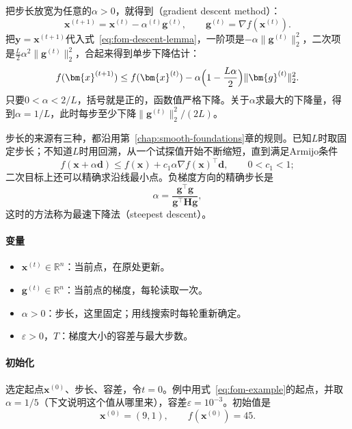 把步长放宽为任意的$\alpha>0$，就得到（gradient descent method）：
\begin{equation}
 \bm{x}^{(t+1)}=\bm{x}^{(t)}-\alpha^{(t)}\bm{g}^{(t)},\qquad \bm{g}^{(t)}=\nabla f(\bm{x}^{(t)}).
 \label{eq:fom-gd}
\end{equation}
把$\bm{y}=\bm{x}^{(t+1)}$代入式~\eqref{eq:fom-descent-lemma}，一阶项是$-\alpha\lVert\bm{g}^{(t)}\rVert_2^2$，二次项是$\tfrac{L}{2}\alpha^2\lVert\bm{g}^{(t)}\rVert_2^2$，合起来得到单步下降估计：
\begin{equation}
 f(\bm{x}^{(t+1)})\leq f(\bm{x}^{(t)})-\alpha\Bigl(1-\frac{L\alpha}{2}\Bigr)\lVert\bm{g}^{(t)}\rVert_2^2.
 \label{eq:fom-gd-decrease}
\end{equation}
只要$0<\alpha<2/L$，括号就是正的，函数值严格下降。关于$\alpha$求最大的下降量，得到$\alpha=1/L$，此时每步至少下降$\lVert\bm{g}^{(t)}\rVert_2^2/(2L)$。

步长的来源有三种，都沿用第~\ref{chap:smooth-foundations}章的规则。已知$L$时取固定步长；不知道$L$时用回溯，从一个试探值开始不断缩短，直到满足Armijo条件
\begin{equation}
 f(\bm{x}+\alpha\bm{d})\leq f(\bm{x})+c_1\alpha\nabla f(\bm{x})^\top\bm{d},\qquad 0<c_1<1;
 \label{eq:fom-armijo}
\end{equation}
二次目标上还可以精确求沿线最小点。负梯度方向的精确步长是
\[
 \alpha=\frac{\bm{g}^\top\bm{g}}{\bm{g}^\top\bm{H}\bm{g}},
\]
这时的方法称为最速下降法（steepest descent）。

\paragraph{变量}
\begin{itemize}
 \item $\bm{x}^{(t)}\in\mathbb{R}^n$：当前点，在原处更新。
 \item $\bm{g}^{(t)}\in\mathbb{R}^n$：当前点的梯度，每轮读取一次。
 \item $\alpha>0$：步长，这里固定；用线搜索时每轮重新确定。
 \item $\varepsilon>0$，$T$：梯度大小的容差与最大步数。
\end{itemize}

\paragraph{初始化}
选定起点$\bm{x}^{(0)}$、步长、容差，令$t=0$。例中用式~\eqref{eq:fom-example}的起点，并取$\alpha=1/5$（下文说明这个值从哪里来），容差$\varepsilon=10^{-3}$。初始值是
\[
 \bm{x}^{(0)}=(9,1),\qquad f(\bm{x}^{(0)})=45.
\]


